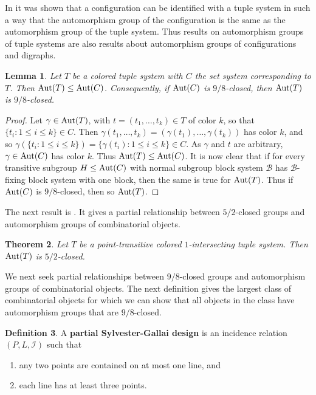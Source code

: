 \documentclass{amsart}
\newtheorem{thrm}{Theorem}[section]
\newtheorem{lem}[thrm]{Lemma}
\theoremstyle{definition}
\newtheorem{definition}[thrm]{Definition}
\theoremstyle{remark}
\numberwithin{equation}{section}
\def\Aut{{\rm Aut}}
\def\cal{\mathcal}
\begin{document}
In \cite[Example 3.7]{Dobson2023apreprint} it was shown that a configuration can be identified with a tuple system in such a way that the automorphism group of the configuration is the same as the automorphism group of the tuple system.  Thus results on automorphism groups of tuple systems are also results about automorphism groups of configurations and digraphs.

\begin{lem}\label{Aut T and C}
Let $T$ be a colored tuple system with $C$ the set system corresponding to $T$.  Then $\Aut(T)\le \Aut(C)$.  Consequently, if $\Aut(C)$ is $9/8$-closed, then $\Aut(T)$ is $9/8$-closed.
\end{lem}

\begin{proof}
Let $\gamma\in\Aut(T)$, with $t = (t_1,\ldots,t_k)\in T$ of color $k$, so that $\{t_i:1\le i\le k\}\in C$.  Then $\gamma(t_1,\ldots,t_k) = (\gamma(t_1),\ldots,\gamma(t_k))$ has color $k$, and so $\gamma(\{t_i:1\le i\le k\}) = \{\gamma(t_i):1\le i\le k\}\in C$.  As $\gamma$ and $t$ are arbitrary, $\gamma\in\Aut(C)$ has color $k$.  Thus $\Aut(T)\le\Aut(C)$.  It is now clear that if for every transitive subgroup $H\le\Aut(C)$ with normal subgroup block system ${\cal B}$ has ${\cal B}$-fixing block system with one block, then the same is true for $\Aut(T)$.  Thus if $\Aut(C)$ is $9/8$-closed, then so $\Aut(T)$.
\end{proof}

The next result is \cite[Theorem 3.6]{Dobson2023apreprint}.  It gives a partial relationship between $5/2$-closed groups and automorphism groups of combinatorial objects.

\begin{thrm}\label{5/2 closed}
Let $T$ be a point-transitive colored $1$-intersecting tuple system.  Then $\Aut(T)$ is $5/2$-closed.
\end{thrm}

We next seek partial relationships between $9/8$-closed groups and automorphism groups of combinatorial objects.  The next definition gives the largest class of combinatorial objects for which we can show that all objects in the class have automorphism groups that are $9/8$-closed.

\begin{definition}
A {\bf partial Sylvester-Gallai design} is an incidence relation $(P,L,{\cal I})$ such that
\begin{enumerate}
\item any two points are contained on at most one line, and
\item each line has at least three points.
\end{enumerate}
\end{definition}
\end{document}
